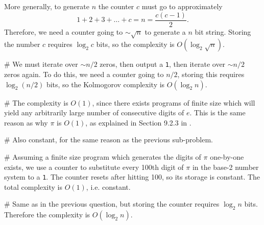 \documentclass[12pt, a4paper]{article}
\begin{document}
{\begin{easylist}[enumerate]
More generally, to generate $n$ the counter $c$ must go to approximately 
\begin{equation*}
	1 + 2 + 3 + \dots + c = n = \frac{c(c-1)}{2}.
\end{equation*}
Therefore, we need a counter going to $\sim \sqrt{n}$ to generate a $n$ bit string.
Storing the number $c$ requires $\log_2 c$ bits, so the complexity is $O \left( \log_2 \sqrt{n} \right)$.

# We must iterate over $\sim n/2$ zeros, then output a \texttt{1}, then iterate over $\sim n/2$ zeros again.
To do this, we need a counter going to $n/2$, storing this requires $\log_2 (n/2)$ bits, so the Kolmogorov complexity is $O \left( \log_2 n \right)$.

# The complexity is $O(1)$, since there exists programs of finite size which will yield any arbitrarily large number of consecutive digits of $e$.
This is the same reason as why $\pi$ is $O(1)$, as explained in Section 9.2.3 in \cite{duda_pattern_2000}.

# Also constant, for the same reason as the previous sub-problem.

# Assuming a finite size program which generates the digits of $\pi$ one-by-one exists, we use a counter to substitute every 100th digit of $\pi$ in the base-2 number system to a \texttt{1}.
The counter resets after hitting 100, so its storage is constant.
The total complexity is $O(1)$, i.e. constant.

# Same as in the previous question, but storing the counter requires $\log_2 n$ bits.
 Therefore the complexity is $O \left( \log_2 n \right)$.
\end{easylist}


}
\end{document}
